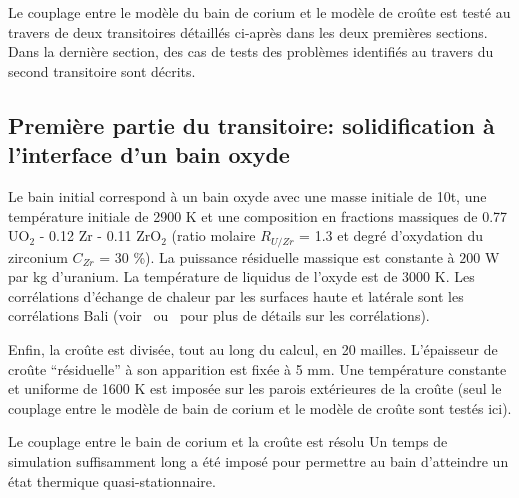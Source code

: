 Le couplage entre le modèle du bain de corium et le modèle de croûte est testé au travers de deux transitoires détaillés ci-après dans les deux premières sections. Dans la dernière section, des cas de tests des problèmes identifiés au travers du second transitoire sont décrits.

\subsection{Première partie du transitoire: solidification à l'interface d'un bain oxyde}
Le bain initial correspond à un bain oxyde avec une masse initiale de 10t, une température initiale de 2900 K et une composition en fractions massiques de 0.77 UO$_2$ - 0.12 Zr - 0.11 ZrO$_2$ (ratio molaire $R_{U/Zr}$ = 1.3 et degré  d'oxydation du zirconium $C_{Zr}$ = 30 \%). La puissance résiduelle massique est constante à $200$ W par kg d'uranium. La température de liquidus de l'oxyde est de 3000 K. Les corrélations d'échange de chaleur par les surfaces haute et latérale sont les corrélations Bali (voir~\cite{Bonnet1999} ou~\cite{Tourniaire2009a} pour plus de détails sur les corrélations). 

Enfin, la croûte est divisée, tout au long du calcul, en 20 mailles. L'épaisseur de croûte ``résiduelle'' à son apparition est fixée à 5 mm. Une température constante et uniforme de 1600 K est imposée sur les parois extérieures de la croûte (seul le couplage entre le modèle de bain de corium et le modèle de croûte sont testés ici).

Le couplage entre le bain de corium et la croûte est résolu
Un temps de simulation suffisamment long a été imposé pour permettre au bain d'atteindre un état thermique quasi-stationnaire.




